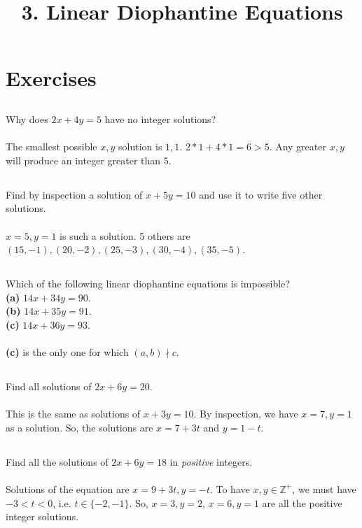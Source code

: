 \documentclass{article}
\begin{document}
\newcommand{\Z}{\mathbb{Z}}

\title{3. Linear Diophantine Equations}
\section{Exercises}

\subsection{}
Why does $2x + 4y = 5$ have no integer solutions?\\~\\
The smallest possible $x, y$ solution is $1, 1$.
$2*1 + 4*1 = 6 > 5$.
Any greater $x, y$ will produce an integer greater than $5$.

\subsection{}
Find by inspection a solution of $x + 5y = 10$ and use it to write five
other solutions.\\~\\
$x = 5, y = 1$ is such a solution.
5 others are $(15, -1), (20, -2), (25, -3), (30, -4), (35, -5)$.

\subsection{}
Which of the following linear diophantine equations is impossible?\\
\textbf{(a)} $14x + 34y = 90$.\\
\textbf{(b)} $14x + 35y = 91$.\\
\textbf{(c)} $14x + 36y = 93$.\\~\\
\textbf{(c)} is the only one for which $(a, b) \nmid c$.

\subsection{}
Find all solutions of $2x + 6y = 20$.\\~\\
This is the same as solutions of $x + 3y = 10$.
By inspection, we have $x = 7, y = 1$ as a solution.
So, the solutions are $x = 7 + 3t$ and $y = 1 - t$.

\subsection{}
Find all the solutions of $2x + 6y = 18$ in \textit{positive} integers.\\~\\
Solutions of the equation are $x = 9 + 3t, y = -t$.
To have $x, y \in \Z^+$, we must have $-3 < t < 0$, i.e. $t \in \{-2, -1\}$.
So, $x = 3, y = 2$, $x = 6, y = 1$ are all the positive integer solutions.
\end{document}
